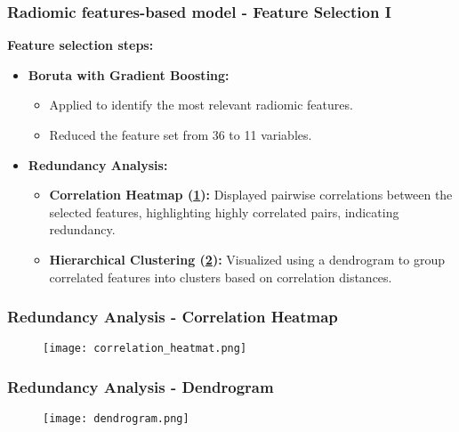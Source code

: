 
\begin{frame}
    \frametitle{Radiomic features-based model - Feature Selection I}
    \vspace{3mm}
	\textbf{Feature selection steps:}
    \vspace{2mm}
    \begin{itemize}
        \item \textbf{Boruta with Gradient Boosting:}
        \begin{itemize}
            \item Applied to identify the most relevant radiomic features.
            \item Reduced the feature set from 36 to 11 variables.
        \end{itemize}

        \vspace{2mm}
        \item \textbf{Redundancy Analysis:}
        \begin{itemize}
            \item \textbf{Correlation Heatmap (\ref{fig:correlation_heatmap}):} Displayed pairwise correlations between the selected features, highlighting highly correlated pairs, indicating redundancy.
            \item \textbf{Hierarchical Clustering (\ref{fig:dendrogram}):} Visualized using a dendrogram to group correlated features into clusters based on correlation distances.
        \end{itemize}
    \end{itemize}

    \vfill 
\end{frame}


\begin{frame}
    \frametitle{Redundancy Analysis - Correlation Heatmap}

    \begin{figure}[h]
        \centering
        \texttt{[image: correlation\_heatmat.png]}
        \label{fig:correlation_heatmap}
    \end{figure}

    \vfill 
\end{frame}



\begin{frame}
    \frametitle{Redundancy Analysis - Dendrogram}

    \begin{figure}[h]
        \centering
        \texttt{[image: dendrogram.png]}
        \label{fig:dendrogram}
    \end{figure}

    \vfill 
\end{frame}

